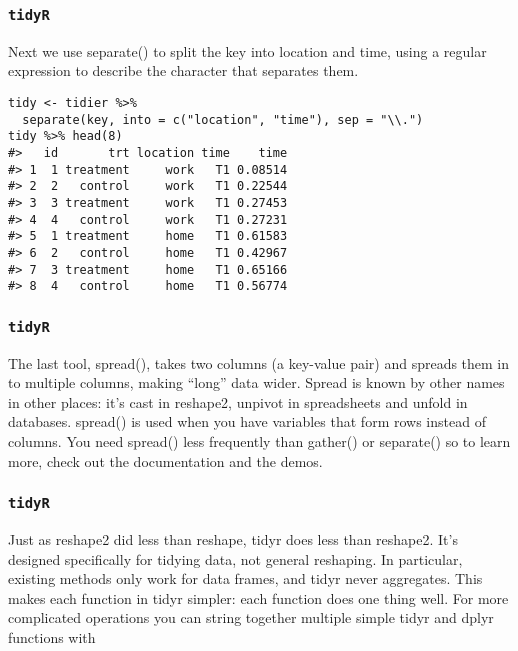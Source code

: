 \begin{frame}[fragile]
\frametitle{\texttt{tidyR} }
Next we use separate() to split the key into location and time, using a regular expression to describe the character that separates them.
\begin{framed}
\begin{verbatim}
tidy <- tidier %>%
  separate(key, into = c("location", "time"), sep = "\\.") 
tidy %>% head(8)
#>   id       trt location time    time
#> 1  1 treatment     work   T1 0.08514
#> 2  2   control     work   T1 0.22544
#> 3  3 treatment     work   T1 0.27453
#> 4  4   control     work   T1 0.27231
#> 5  1 treatment     home   T1 0.61583
#> 6  2   control     home   T1 0.42967
#> 7  3 treatment     home   T1 0.65166
#> 8  4   control     home   T1 0.56774
\end{verbatim}
\end{framed}
\end{frame}
\begin{frame}[fragile]
\frametitle{\texttt{tidyR} }
The last tool, spread(), takes two columns (a key-value pair) and spreads them in to multiple columns, making “long” data wider. Spread is known by other names in other places: it’s cast in reshape2, unpivot in spreadsheets and unfold in databases. spread() is used when you have variables that form rows instead of columns. You need spread() less frequently than gather() or separate() so to learn more, check out the documentation and the demos.


\end{frame}
\begin{frame}[fragile]
\frametitle{\texttt{tidyR} }

Just as reshape2 did less than reshape, tidyr does less than reshape2. It’s designed specifically for tidying data, not general reshaping. In particular, existing methods only work for data frames, and tidyr never aggregates. This makes each function in tidyr simpler: each function does one thing well. For more complicated operations you can string together multiple simple tidyr and dplyr functions with %


\end{frame}

